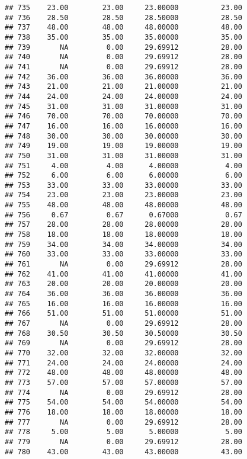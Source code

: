 \documentclass[
]{article}
\begin{document}
\begin{verbatim}
## 735    23.00        23.00     23.00000          23.00
## 736    28.50        28.50     28.50000          28.50
## 737    48.00        48.00     48.00000          48.00
## 738    35.00        35.00     35.00000          35.00
## 739       NA         0.00     29.69912          28.00
## 740       NA         0.00     29.69912          28.00
## 741       NA         0.00     29.69912          28.00
## 742    36.00        36.00     36.00000          36.00
## 743    21.00        21.00     21.00000          21.00
## 744    24.00        24.00     24.00000          24.00
## 745    31.00        31.00     31.00000          31.00
## 746    70.00        70.00     70.00000          70.00
## 747    16.00        16.00     16.00000          16.00
## 748    30.00        30.00     30.00000          30.00
## 749    19.00        19.00     19.00000          19.00
## 750    31.00        31.00     31.00000          31.00
## 751     4.00         4.00      4.00000           4.00
## 752     6.00         6.00      6.00000           6.00
## 753    33.00        33.00     33.00000          33.00
## 754    23.00        23.00     23.00000          23.00
## 755    48.00        48.00     48.00000          48.00
## 756     0.67         0.67      0.67000           0.67
## 757    28.00        28.00     28.00000          28.00
## 758    18.00        18.00     18.00000          18.00
## 759    34.00        34.00     34.00000          34.00
## 760    33.00        33.00     33.00000          33.00
## 761       NA         0.00     29.69912          28.00
## 762    41.00        41.00     41.00000          41.00
## 763    20.00        20.00     20.00000          20.00
## 764    36.00        36.00     36.00000          36.00
## 765    16.00        16.00     16.00000          16.00
## 766    51.00        51.00     51.00000          51.00
## 767       NA         0.00     29.69912          28.00
## 768    30.50        30.50     30.50000          30.50
## 769       NA         0.00     29.69912          28.00
## 770    32.00        32.00     32.00000          32.00
## 771    24.00        24.00     24.00000          24.00
## 772    48.00        48.00     48.00000          48.00
## 773    57.00        57.00     57.00000          57.00
## 774       NA         0.00     29.69912          28.00
## 775    54.00        54.00     54.00000          54.00
## 776    18.00        18.00     18.00000          18.00
## 777       NA         0.00     29.69912          28.00
## 778     5.00         5.00      5.00000           5.00
## 779       NA         0.00     29.69912          28.00
## 780    43.00        43.00     43.00000          43.00

\end{verbatim}
\end{document}
